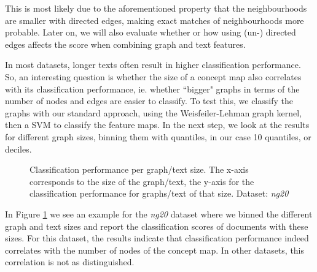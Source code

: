 This is most likely due to the aforementioned property that the neighbourhoods are smaller with directed edges, making exact matches of neighbourhoods more probable.
Later on, we will also evaluate whether or how using (un-) directed edges affects the score when combining graph and text features.

In most datasets, longer texts often result in higher classification performance.
So, an interesting question is whether the size of a concept map also correlates with its classification performance, ie. whether ``bigger" graphs in terms of the number of nodes and edges are easier to classify.
To test this, we classify the graphs with our standard approach, using the Weisfeiler-Lehman graph kernel, then a SVM to classify the feature maps.
In the next step, we look at the results for different graph sizes, binning them with quantiles, in our case 10 quantiles, or deciles.

\begin{figure}[ht]
	\hfill
	\caption{Classification performance per graph/text size. The x-axis corresponds to the size of the graph/text, the y-axis for the classification performance for graphs/text of that size. Dataset: \textit{ng20}}\label{fig:graph_size_performance}
\end{figure}

In Figure \ref{fig:graph_size_performance} we see an example for the \textit{ng20} dataset where we binned the different graph and text sizes and report the classification scores of documents with these sizes.
For this dataset, the results indicate that classification performance indeed correlates with the number of nodes of the concept map.
In other datasets, this correlation is not as distinguished.



